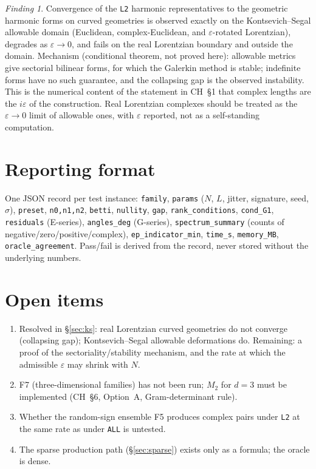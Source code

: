 \documentclass[11pt]{article}
\theoremstyle{definition}
\theoremstyle{plain}
\theoremstyle{remark}
\newtheorem{finding}{Finding}[section]
\newcommand{\ttt}[1]{\texttt{#1}}
\begin{document}
\begin{finding}
Convergence of the \ttt{L2} harmonic representatives to the geometric harmonic forms on curved geometries is observed exactly on the Kontsevich--Segal allowable domain (Euclidean, complex-Euclidean, and \(\varepsilon\)-rotated Lorentzian), degrades as \(\varepsilon\to0\), and fails on the real Lorentzian boundary and outside the domain. Mechanism (conditional theorem, not proved here): allowable metrics give sectorial bilinear forms, for which the Galerkin method is stable; indefinite forms have no such guarantee, and the collapsing gap is the observed instability. This is the numerical content of the statement in CH~\S1 that complex lengths are the \(i\varepsilon\) of the construction. Real Lorentzian complexes should be treated as the \(\varepsilon\to0\) limit of allowable ones, with \(\varepsilon\) reported, not as a self-standing computation.
\end{finding}

\section{Reporting format}
One JSON record per test instance: \ttt{family}, \ttt{params} (\(N\), \(L\), jitter, signature, seed, \(\sigma\)), \ttt{preset}, \ttt{n0,n1,n2}, \ttt{betti}, \ttt{nullity}, \ttt{gap}, \ttt{rank\_conditions}, \ttt{cond\_G1}, \ttt{residuals} (E-series), \ttt{angles\_deg} (G-series), \ttt{spectrum\_summary} (counts of negative/zero/positive/complex), \ttt{ep\_indicator\_min}, \ttt{time\_s}, \ttt{memory\_MB}, \ttt{oracle\_agreement}. Pass/fail is derived from the record, never stored without the underlying numbers.

\section{Open items}\label{sec:open}
\begin{enumerate}[nosep]
\item Resolved in \S\ref{sec:ks}: real Lorentzian curved geometries do not converge (collapsing gap); Kontsevich--Segal allowable deformations do. Remaining: a proof of the sectoriality/stability mechanism, and the rate at which the admissible \(\varepsilon\) may shrink with \(N\).
\item F7 (three-dimensional families) has not been run; \(M_2\) for \(d=3\) must be implemented (CH~\S6, Option~A, Gram-determinant rule).
\item Whether the random-sign ensemble F5 produces complex pairs under \ttt{L2} at the same rate as under \ttt{ALL} is untested.
\item The sparse production path (\S\ref{sec:sparse}) exists only as a formula; the oracle is dense.
\end{enumerate}
\end{document}
